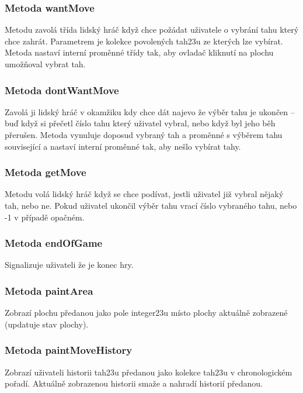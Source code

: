 \documentclass{article}
\begin{document}
\subsubsection{Metoda wantMove}
Metodu zavol\'a t\v{r}\'ida lidsk\'y hr\'a\v{c} kdy\v{z} chce po\v{z}\'adat u\v{z}ivatele o vybr\'an\'i tahu kter\'y chce zahr\'at. Parametrem je kolekce povolen\'ych tah\accent23u ze kter\'ych lze vyb\'irat. Metoda nastav\'i intern\'i prom\v{e}nn\'e t\v{r}\'idy tak, aby ovlada\v{c} kliknut\'i na plochu umo\v{z}\v{n}oval vybrat tah.

\subsubsection{Metoda dontWantMove}
Zavol\'a ji lidsk\'y hr\'a\v{c} v okam\v{z}iku kdy chce d\'at najevo \v{z}e v\'yb\v{e}r tahu je ukon\v{c}en – bu\v{d} kdy\v{z} si p\v{r}e\v{c}etl \v{c}\'islo tahu kter\'y u\v{z}ivatel vybral, nebo kdy\v{z} byl jeho b\v{e}h p\v{r}eru\v{s}en. Metoda vynuluje doposud vybran\'y tah a prom\v{e}nn\'e s v\'yb\v{e}rem tahu souvisej\'ic\'i a nastav\'i intern\'i prom\v{e}nn\'e tak, aby ne\v{s}lo vyb\'irat tahy.

\subsubsection{Metoda getMove}
Metodu vol\'a lidsk\'y hr\'a\v{c} kdy\v{z} se chce pod\'ivat, jestli u\v{z}ivatel ji\v{z} vybral n\v{e}jak\'y tah, nebo ne. Pokud u\v{z}ivatel ukon\v{c}il v\'yb\v{e}r tahu vrac\'i \v{c}\'islo vybran\'eho tahu, nebo -1 v p\v{r}\'ipad\v{e} opa\v{c}n\'em.

\subsubsection{Metoda endOfGame}
Signalizuje u\v{z}ivateli \v{z}e je konec hry.

\subsubsection{Metoda paintArea}
Zobraz\'i plochu p\v{r}edanou jako pole integer\accent23u m\'isto plochy aktu\'aln\v{e} zobrazen\'e (updatuje stav plochy).

\subsubsection{Metoda paintMoveHistory}
Zobraz\'i u\v{z}ivateli historii tah\accent23u p\v{r}edanou jako kolekce tah\accent23u v chronologick\'em po\v{r}ad\'i. Aktu\'aln\v{e} zobrazenou historii sma\v{z}e a nahrad\'i histori\'i p\v{r}edanou.
\end{document}
